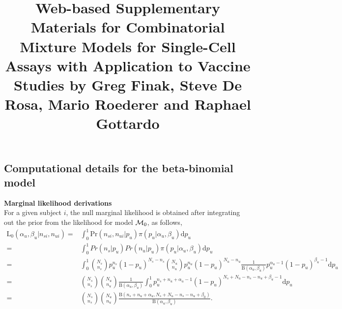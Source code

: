 \documentclass{article}
\title{Web-based Supplementary Materials for Combinatorial Mixture Models for Single-Cell Assays with Application to Vaccine Studies by Greg Finak, Steve De Rosa, Mario Roederer and Raphael Gottardo}
\date{}
\begin{document}
\maketitle
\appendix
\renewcommand{\thesubsection}{Web Appendix \Alph{subsection}:}
\setcounter{subsection}{0}
\renewcommand{\figurename}{\textbf{Web Figure}}
\renewcommand{\thefigure}{\textbf{\Alph{figure}}}
\setcounter{figure}{0}

\section*{}
\subsection{Computational details for the beta-binomial model}
\noindent\textbf{Marginal likelihood derivations}\\
For a given subject $i$, the null marginal likelihood is obtained after integrating out the prior from the likelihood for model ${\cal M}_0$, as follows,
\[
\begin{split}
\mathrm{L_0}(\alpha_u,\beta_u|n_{si},n_{ui}) =&\int_0^1 \mathrm{Pr}(n_{si},n_{ui}|p_u)\pi(p_u|\alpha_u,\beta_u)\mathrm{d}p_u\\
=& \int_0^1Pr(n_s|p_u)Pr(n_u|p_u)\pi(p_u|\alpha_u,\beta_u) \mathrm{d}p_u\\
=&\int_0^1\binom{N_s}{n_s}p_u^{n_s}(1-p_u)^{N_s-n_s}\binom{N_u}{n_u}p_u^{n_u}(1-p_u)^{N_u-n_u}\frac{1}{\mathrm{B}(\alpha_u,\beta_u)}p_u^{\alpha_u-1}(1-p_u)^{\beta_u-1} \mathrm{d}p_u\\
=&\binom{N_s}{n_s}\binom{N_u}{n_u}\frac{1}{\mathrm{B}(\alpha_u,\beta_u)}\int_0^1 p_u^{n_s+n_u+\alpha_u-1}(1-p_u)^{N_s+N_u-n_s-n_u+\beta_u-1} \mathrm{d}p_u\\
=&\binom{N_s}{n_s}\binom{N_u}{n_u}\frac{\mathrm{B}(n_s+n_u+\alpha_u,N_s+N_u-n_s-n_u+\beta_0)}{\mathrm{B}(\alpha_u,\beta_u)}.
\end{split}
\]
\end{document}
